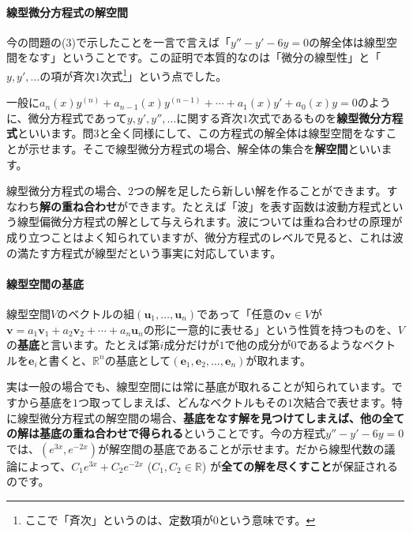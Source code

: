 \paragraph{線型微分方程式の解空間}

今の問題の(3)で示したことを一言で言えば「$y'' - y' - 6y = 0$の解全体は線型空間をなす」ということです。この証明で本質的なのは「微分の線型性」と「$y,y',\ldots$の項が斉次$1$次式\footnote{ここで「斉次」というのは、定数項が$0$という意味です。}」という点でした。

一般に$a_n(x) y^{(n)} + a_{n - 1}(x) y^{(n-1)} + \cdots + a_1(x) y' + a_0(x) y = 0$のように、微分方程式であって$y, y', y'',\ldots$に関する斉次$1$次式であるものを\textbf{線型微分方程式}といいます。問3と全く同様にして、この方程式の解全体は線型空間をなすことが示せます。そこで線型微分方程式の場合、解全体の集合を\textbf{解空間}といいます。

線型微分方程式の場合、$2$つの解を足したら新しい解を作ることができます。すなわち\textbf{解の重ね合わせ}ができます。たとえば「波」を表す函数は波動方程式という線型偏微分方程式の解として与えられます。波については重ね合わせの原理が成り立つことはよく知られていますが、微分方程式のレベルで見ると、これは波の満たす方程式が線型だという事実に対応しています。

\paragraph{線型空間の基底}

線型空間$V$のベクトルの組$(\bm{u}_1, \ldots, \bm{u}_n)$であって「任意の$\bm{v}\in V$が$\bm{v} = a_1 \bm{v}_1 + a_2 \bm{v}_2 + \cdots + a_n \bm{u}_n$の形に一意的に表せる」という性質を持つものを、$V$の\textbf{基底}と言います。たとえば第$i$成分だけが$1$で他の成分が$0$であるようなベクトルを$\bm{e}_i$と書くと、$\mathbb{R}^n$の基底として$(\bm{e}_1, \bm{e}_2, \ldots, \bm{e}_n)$が取れます。

実は一般の場合でも、線型空間には常に基底が取れることが知られています。ですから基底を$1$つ取ってしまえば、どんなベクトルもその$1$次結合で表せます。特に線型微分方程式の解空間の場合、\textbf{基底をなす解を見つけてしまえば、他の全ての解は基底の重ね合わせで得られる}ということです。今の方程式$y'' - y' - 6y = 0$では、$(e^{3x}, e^{-2x})$が解空間の基底であることが示せます。だから線型代数の議論によって、$C_1 e^{3x} + C_2 e^{-2x}$ ($C_1, C_2\in\mathbb{R}$) が\textbf{全ての解を尽くすこと}が保証されるのです。

